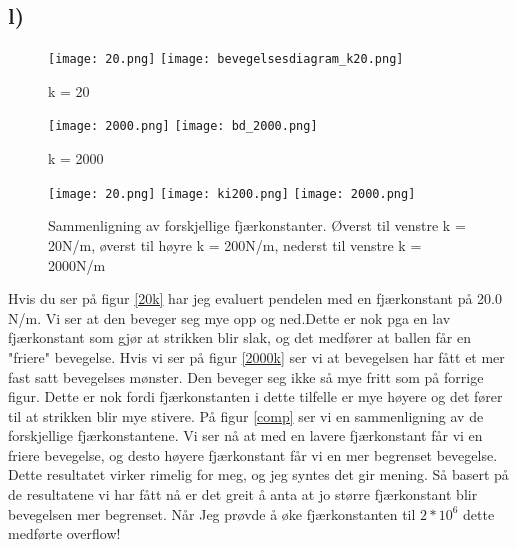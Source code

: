 \documentclass[a4paper,12pt,norsk]{article}
\begin{document}
\subsection*{l)}
\begin{figure}[h!]
\texttt{[image: 20.png]} 
\texttt{[image: bevegelsesdiagram\_k20.png]} 
\caption{k = 20}
\label{20k}
\end{figure}
\begin{figure}[h!]
\texttt{[image: 2000.png]} 
\texttt{[image: bd\_2000.png]} 
\caption{k = 2000}
\label{2000k}
\end{figure}
\begin{figure}[h!]
\texttt{[image: 20.png]}
\texttt{[image: ki200.png]} 
\texttt{[image: 2000.png]} 
\caption{Sammenligning av forskjellige fjærkonstanter. Øverst til venstre k = 20N/m, øverst til høyre k = 200N/m, nederst til venstre k = 2000N/m}
\label{comp}
\end{figure}
Hvis du ser på figur \vref{20k} har jeg evaluert pendelen med en fjærkonstant på 20.0 N/m. Vi ser at den beveger seg mye opp og ned.Dette er nok pga en lav fjærkonstant som gjør at strikken blir slak, og det medfører at ballen får en "friere" bevegelse. Hvis vi ser på figur \vref{2000k} ser vi at bevegelsen har fått et mer fast satt bevegelses mønster. Den beveger seg ikke så mye fritt som på forrige figur. Dette er nok fordi fjærkonstanten i dette tilfelle er mye høyere og det fører til at strikken blir mye stivere.
På figur \vref{comp} ser vi en sammenligning av de forskjellige fjærkonstantene. Vi ser nå at med en lavere fjærkonstant får vi en friere bevegelse, og desto høyere fjærkonstant får vi en mer begrenset bevegelse. Dette resultatet virker rimelig for meg, og jeg syntes det gir mening. Så basert på de resultatene vi har fått nå er det greit å anta at jo større fjærkonstant blir bevegelsen mer begrenset. Når Jeg prøvde å øke fjærkonstanten til $2*10^6$ dette medførte overflow! 
\end{document}
